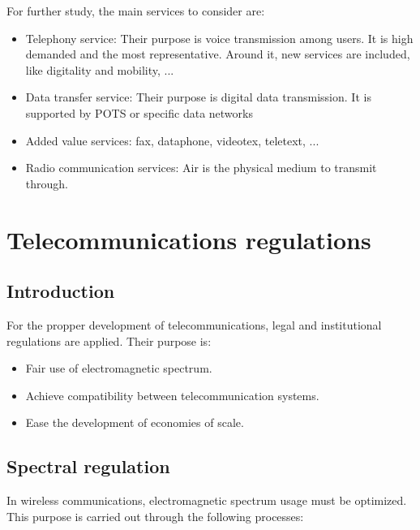 \documentclass[../main.tex]{subfiles}
\begin{document}
For further study, the main services to consider are:

\begin{itemize}
	\item Telephony service: Their purpose is voice transmission among users. It is high demanded and the most representative. Around it, new services are included, like digitality and mobility, ...
	\item Data transfer service: Their purpose is digital data transmission. It is supported by POTS or specific data networks
	\item Added value services: fax, dataphone, videotex, teletext, ...
	\item Radio communication services: Air is the physical medium to transmit through.
\end{itemize}

\section{Telecommunications regulations}

\subsection{Introduction}

For the propper development of telecommunications, legal and institutional regulations are applied. Their purpose is:

\begin{itemize}
	\item Fair use of electromagnetic spectrum.
	\item Achieve compatibility between telecommunication systems.
	\item Ease the development of economies of scale.
\end{itemize}

\subsection{Spectral regulation}

In wireless communications, electromagnetic spectrum usage must be optimized. This purpose is carried out through the following processes:
\end{document}
